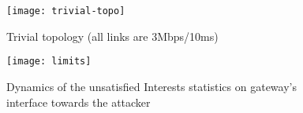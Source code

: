 













\begin{figure}[htbp]
  \centering
  \texttt{[image: trivial-topo]}
  \caption{Trivial topology (all links are 3Mbps/10ms)}
  \label{fig:trivial topology}
\end{figure}


\begin{figure}[htbp]
  \centering
  \texttt{[image: limits]}
  \caption{Dynamics of the unsatisfied Interests statistics on gateway's interface towards the attacker}
  \label{fig:ratio example}
\end{figure}


